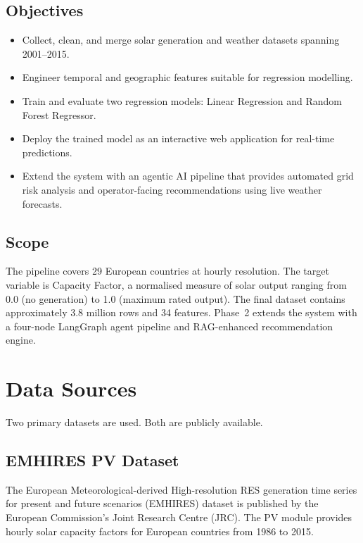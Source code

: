 \documentclass[12pt, a4paper]{article}
\begin{document}
\subsection{Objectives}

\begin{itemize}[noitemsep]
    \item Collect, clean, and merge solar generation and weather datasets spanning 2001--2015.
    \item Engineer temporal and geographic features suitable for regression modelling.
    \item Train and evaluate two regression models: Linear Regression and Random Forest Regressor.
    \item Deploy the trained model as an interactive web application for real-time predictions.
    \item Extend the system with an agentic AI pipeline that provides automated grid risk analysis and operator-facing recommendations using live weather forecasts.
\end{itemize}

\subsection{Scope}

The pipeline covers 29 European countries at hourly resolution. The target variable is Capacity Factor, a normalised measure of solar output ranging from 0.0 (no generation) to 1.0 (maximum rated output). The final dataset contains approximately 3.8 million rows and 34 features. Phase~2 extends the system with a four-node LangGraph agent pipeline and RAG-enhanced recommendation engine.

\newpage
\section{Data Sources}

Two primary datasets are used. Both are publicly available.

\subsection{EMHIRES PV Dataset}

The European Meteorological-derived High-resolution RES generation time series for present and future scenarios (EMHIRES) dataset is published by the European Commission's Joint Research Centre (JRC). The PV module provides hourly solar capacity factors for European countries from 1986 to 2015.
\end{document}

